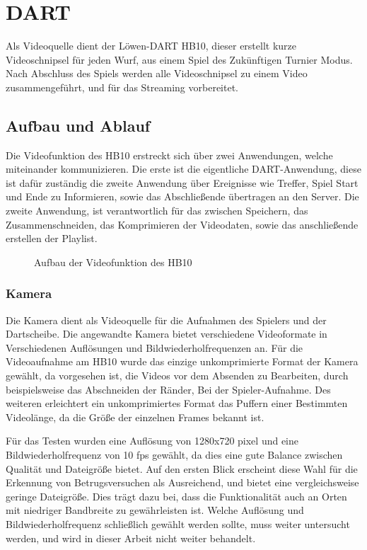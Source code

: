 \chapter{DART}

Als Videoquelle dient der Löwen-DART HB10, dieser erstellt kurze Videoschnipsel für jeden Wurf, aus einem Spiel des Zukünftigen Turnier Modus. Nach Abschluss des Spiels werden alle Videoschnipsel zu einem Video zusammengeführt, und für das Streaming vorbereitet. 

\section{Aufbau und Ablauf}

Die Videofunktion des HB10 erstreckt sich über zwei Anwendungen, welche miteinander kommunizieren. Die erste ist die eigentliche DART-Anwendung, diese ist dafür zuständig die zweite Anwendung über Ereignisse wie Treffer, Spiel Start und Ende zu Informieren,
sowie das Abschließende übertragen an den Server. Die zweite Anwendung, ist verantwortlich für das zwischen Speichern, das Zusammenschneiden, das Komprimieren der Videodaten, sowie das anschließende erstellen der Playlist.

\begin{figure}[H]
    \centering
    
    \caption{Aufbau der Videofunktion des HB10}
    \label{fig:dartaufbau}
\end{figure}

\subsection{Kamera}
Die Kamera dient als Videoquelle für die Aufnahmen des Spielers und der Dartscheibe. Die angewandte Kamera bietet verschiedene Videoformate in Verschiedenen Auflösungen und Bildwiederholfrequenzen an. Für die Videoaufnahme am HB10 wurde das einzige unkomprimierte Format der Kamera gewählt, 
da vorgesehen ist, die Videos vor dem Absenden zu Bearbeiten, durch beispielsweise das Abschneiden der Ränder, Bei der Spieler-Aufnahme. Des weiteren erleichtert ein unkomprimiertes Format das Puffern einer Bestimmten Videolänge, da die Größe der einzelnen Frames bekannt ist.

Für das Testen wurden eine Auflösung von 1280x720 pixel und eine Bildwiederholfrequenz von 10 fps gewählt, da dies eine gute Balance zwischen Qualität und Dateigröße bietet. Auf den ersten Blick erscheint diese Wahl für die Erkennung von Betrugsversuchen als Ausreichend, 
und bietet eine vergleichsweise geringe Dateigröße. Dies trägt dazu bei, dass die Funktionalität auch an Orten mit niedriger Bandbreite zu gewährleisten ist. Welche Auflösung und Bildwiederholfrequenz schließlich gewählt werden sollte, muss weiter untersucht werden, 
und wird in dieser Arbeit nicht weiter behandelt.

